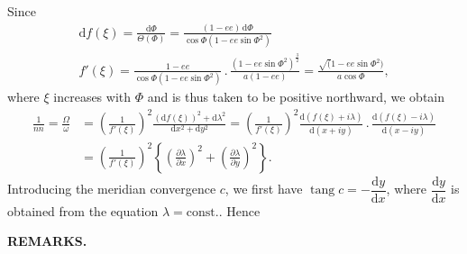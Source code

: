 {Since
\[
\begin{gathered}
\mathrm df(\xi)=\frac{\mathrm d\Phi}{\Theta(\Phi)}
=\frac{(1-ee)\,\mathrm d\Phi}{\cos\Phi(1-ee\sin\Phi^2)}\\
f'(\xi)=\frac{1-ee}{\cos\Phi(1-ee\sin\Phi^2)}
\,.\,\frac{(1-ee\sin\Phi^2)^{\frac32}}{a(1-ee)}
=\frac{\surd(1-ee\sin\Phi^2)}{a\cos\Phi},
\end{gathered}
\]
\noindent where \(\xi\) increases with \(\Phi\) and is thus taken to be positive northward, we obtain
\[
\begin{aligned}
\frac1{nn}=\frac{\Omega}{\omega}
 &=\left(\frac1{f'(\xi)}\right)^2
 \frac{(\mathrm df(\xi))^2+\mathrm d\lambda^2}{\mathrm dx^2+\mathrm dy^2}
 =\left(\frac1{f'(\xi)}\right)^2
 \frac{\mathrm d(f(\xi)+i\lambda)}{\mathrm d(x+iy)}
 \,.\,\frac{\mathrm d(f(\xi)-i\lambda)}{\mathrm d(x-iy)}\\
 &=\left(\frac1{f'(\xi)}\right)^2
 \left\{\left(\frac{\partial\lambda}{\partial x}\right)^2+
 \left(\frac{\partial\lambda}{\partial y}\right)^2\right\}.
\end{aligned}
\]
Introducing the meridian convergence \(c\), we first have
\(\operatorname{tang}c=-\dfrac{\mathrm dy}{\mathrm dx}\), where
\(\dfrac{\mathrm dy}{\mathrm dx}\) is obtained from the equation
\(\lambda=\mathrm{const.}\). Hence
\par}

\par\clearpage
\noindent{}\hfill{\small\textbf{REMARKS.}}\hfill\null\par\medskip

